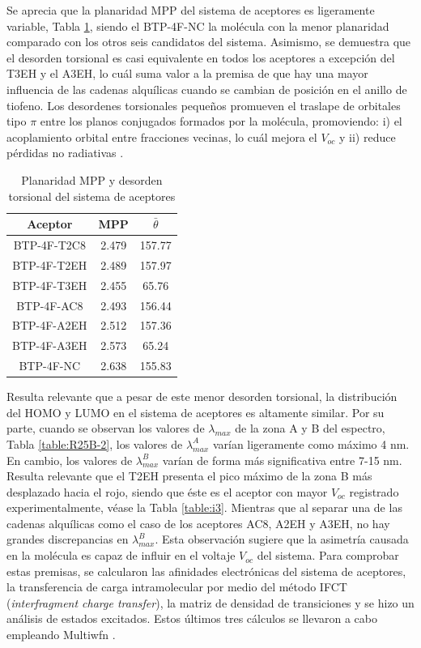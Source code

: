 \noindent Se aprecia que la planaridad MPP del sistema de aceptores es ligeramente variable, Tabla \ref{table:R25B-10}, siendo el BTP-4F-NC la molécula con la menor planaridad comparado con los otros seis candidatos del sistema. Asimismo, se demuestra que el desorden torsional es casi equivalente en todos los aceptores a excepción del T3EH y el A3EH, lo cuál suma valor a la premisa de que hay una mayor influencia de las cadenas alquílicas cuando se cambian de posición en el anillo de tiofeno. Los desordenes torsionales pequeños promueven el traslape de orbitales tipo $\pi$ entre los planos conjugados formados por la molécula, promoviendo: i) el acoplamiento orbital entre fracciones vecinas, lo cuál mejora el $V_{oc}$ y ii) reduce pérdidas no radiativas \cite{wang2025impact}.
\begin{table}[H] %
\caption{Planaridad MPP y desorden torsional del sistema de aceptores}
\label{table:R25B-10} \vspace{-0.5cm}
\begin{center} 
\begin{tabular}{ccc}
\hline
Aceptor & MPP  & $\bar{\theta}$ \\ \hline
BTP-4F-T2C8 &  2.479 &  157.77\\
BTP-4F-T2EH & 2.489 & 157.97\\
BTP-4F-T3EH & 2.455 & 65.76 \\
BTP-4F-AC8 & 2.493 & 156.44 \\
BTP-4F-A2EH & 2.512 & 157.36 \\
BTP-4F-A3EH & 2.573 & 65.24 \\
BTP-4F-NC & 2.638 & 155.83  \\ \hline
\end{tabular}
\end{center}
\vspace{-0.2cm}
\end{table} 
\noindent Resulta relevante que a pesar de este menor desorden torsional, la distribución del  HOMO y LUMO en el sistema de aceptores es altamente similar. Por su parte, cuando se observan los valores de $\lambda_{max}$ de la zona A y B del espectro, Tabla \ref{table:R25B-2}, los valores de $\lambda_{max}^A$ varían ligeramente como máximo 4 nm. En cambio, los valores de $\lambda_{max}^B$ varían de forma más significativa entre 7-15 nm. Resulta relevante que el T2EH presenta el pico máximo de la zona B más desplazado hacia el rojo, siendo que éste es el aceptor con mayor $V_{oc}$ registrado experimentalmente, véase la Tabla \ref{table:i3}. Mientras que al separar una de las cadenas alquílicas como el caso de los aceptores AC8, A2EH y A3EH, no hay grandes discrepancias en $\lambda_{max}^B$. Esta observación sugiere que la asimetría causada en la molécula es capaz de influir en el voltaje $V_{oc}$ del sistema. Para comprobar estas premisas, se calcularon las afinidades electrónicas del sistema de aceptores, la transferencia de carga intramolecular por medio del método IFCT (\textit{interfragment charge transfer}), la matriz de densidad de transiciones y se hizo un análisis de estados excitados. Estos últimos tres cálculos se llevaron a cabo empleando Multiwfn \cite{lu2024comprehensive}.
